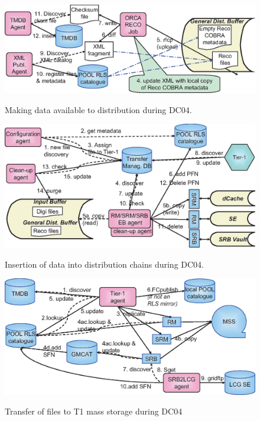 \documentclass{cmspaper}
\begin{document}



\clearpage
\begin{figure}[tbp]
\centering \includegraphics[angle = 90]{T0-flow.eps}
\label{fig:flow1}
\caption{Making data available to distribution during DC04.}
\end{figure}
\clearpage
\begin{figure}[tbp]
\centering
\includegraphics[angle = 90]{T0-flow-2.eps}
\label{fig:flow2}
\caption{Insertion of data into distribution chains during DC04.}
\end{figure}
\clearpage
\begin{figure}[tbp]
\centering
\includegraphics[angle = 90]{T1-flow.eps}
\label{fig:flow3}
\caption{Transfer of files to T1 mass storage during DC04}
\end{figure}
\clearpage
\end{document}
